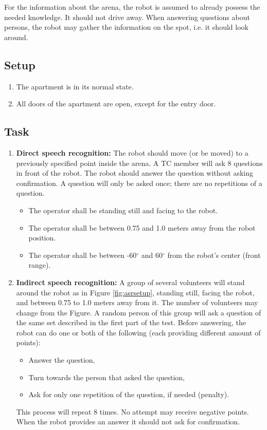 For the information about the arena, the robot is assumed to already possess the needed knowledge. It should not drive away. 
When answering questions about persons, the robot may gather the information on the spot, i.e. it should look around. 

\subsection{Setup}
\begin{enumerate}
\item The apartment is in its normal state.
\item All doors of the apartment are open, except for the entry door. 
\end{enumerate}

\subsection{Task}

\begin{enumerate}
\item \textbf{Direct speech recognition: } The robot should move (or be moved) to a previously specified point inside the arena. 
  A TC member will ask 8 questions in front of the robot. 
  The robot should answer the question without asking confirmation.
  A question will only be asked once; there are no repetitions of a question. 
\begin{itemize}
\item The operator shall be standing still and facing to the robot.
\item The operator shall be between 0.75 and 1.0 meters away from the robot position.
\item The operator shall be between -60$^{\circ}$ and 60$^{\circ}$ from the robot's center (front range).
\end{itemize}
\item \textbf{Indirect speech recognition: } A group of several volunteers will stand around the robot as in Figure \ref{fig:asrsetup}, standing still, facing the robot, and between 0.75 to 1.0 meters away from it. The number of volunteers may change from the Figure. A random person of this group will ask a question of the same set described in the first part of the test. Before answering, the robot can do one or both of the following (each providing different amount of points):
\begin{itemize}
\item Answer the question,
\item Turn towards the person that asked the question,
\item Ask for only one repetition of the question, if needed (penalty).
\end{itemize}
This process will repeat 8 times. No attempt may receive negative points. When the robot provides an answer it should not ask for confirmation.
\end{enumerate}

